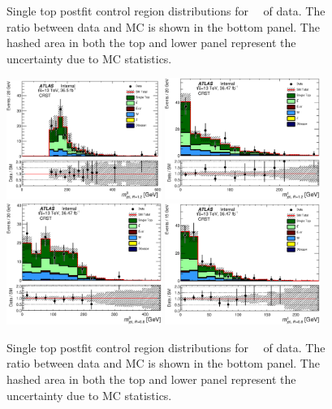 \begin{figure}[htbp]
\begin{center}
\end{center}
\caption{Single top postfit control region distributions for \intlumi\ \ifb\ of data. The ratio between data and MC is shown in the bottom panel. The hashed area in both the top and lower panel represent the uncertainty due to MC statistics.}
\label{fig:CRSTPTs}
\end{figure}

\begin{figure}[htbp]
\begin{center}
\includegraphics[width=0.45\textwidth]{figures/singleTop/postfit/AntiKt12M_0__CRST.eps}
\includegraphics[width=0.45\textwidth]{figures/singleTop/postfit/AntiKt12M_1__CRST.eps}
\includegraphics[width=0.45\textwidth]{figures/singleTop/postfit/AntiKt8M_0__CRST.eps}
\includegraphics[width=0.45\textwidth]{figures/singleTop/postfit/AntiKt8M_1__CRST.eps}

\end{center}
\caption{Single top postfit control region distributions for \intlumi\ \ifb\ of data. The ratio between data and MC is shown in the bottom panel. The hashed area in both the top and lower panel represent the uncertainty due to MC statistics.}
\label{fig:CRSTMasses}
\end{figure}




\clearpage